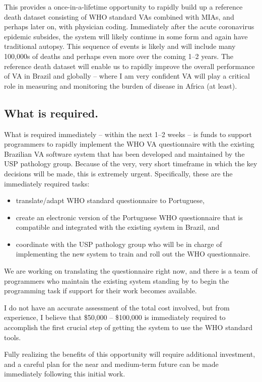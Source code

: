 \documentclass[12pt]{article}
\begin{document}
This provides a once-in-a-lifetime opportunity to rapidly build up a reference death dataset consisting of WHO standard VAs combined with MIAs, and perhaps later on, with physician coding.  Immediately after the acute coronavirus epidemic subsides, the system will likely continue in some form and again have traditional autopsy. This sequence of events is likely and will include many 100,000s of deaths and perhaps even more over the coming 1--2 years.  The reference death dataset will enable us to rapidly improve the overall performance of VA in Brazil and globally -- where I am very confident VA will play a critical role in measuring and monitoring the burden of disease in Africa (at least).

\subsection{What is required.}

What is required immediately -- within the next 1--2 weeks -- is funds to support programmers to rapidly implement the WHO VA questionnaire with the existing Brazilian VA software system that has been developed and maintained by the USP pathology group.  Because of the very, very short timeframe in which the key decisions will be made, this is extremely urgent.  Specifically, these are the immediately required tasks:
\begin{itemize}
\item translate/adapt WHO standard questionnaire to Portuguese,
\item create an electronic version of the Portuguese WHO questionnaire that is compatible and integrated with the existing system in Brazil, and
\item coordinate with the USP pathology group who will be in charge of implementing the new system to train and roll out the WHO questionnaire.
\end{itemize}
We are working on translating the questionnaire right now, and there is a team of programmers who maintain the existing system standing by to begin the programming task if support for their work becomes available.  

I do not have an accurate assessment of the total cost involved, but from experience, I believe that \$50,000 -- \$100,000 is immediately required to accomplish the first crucial step of getting the system to use the WHO standard tools.  

Fully realizing the benefits of this opportunity will require additional investment, and a careful plan for the near and medium-term future can be made immediately following this initial work. 
\end{document}
